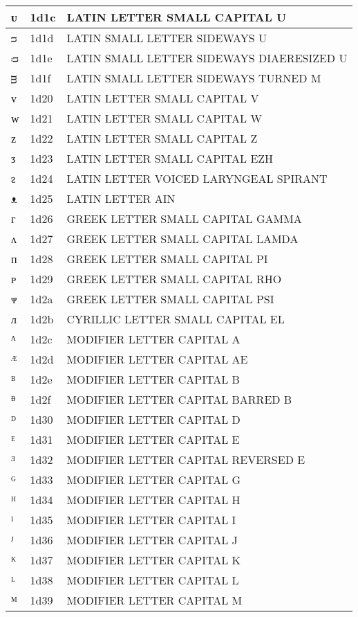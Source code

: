 \documentclass[12pt,letterpaper,openany]{book}
\begin{document}
\begin{center}
\begin{supertabular}{|m{0.25in}|m{0.5in}|m{4in}|}
ᴜ & 1d1c & LATIN LETTER SMALL CAPITAL U\\\hline
ᴝ & 1d1d & LATIN SMALL LETTER SIDEWAYS U\\\hline
ᴞ & 1d1e & LATIN SMALL LETTER SIDEWAYS DIAERESIZED U\\\hline
ᴟ & 1d1f & LATIN SMALL LETTER SIDEWAYS TURNED M\\\hline
ᴠ & 1d20 & LATIN LETTER SMALL CAPITAL V\\\hline
ᴡ & 1d21 & LATIN LETTER SMALL CAPITAL W\\\hline
ᴢ & 1d22 & LATIN LETTER SMALL CAPITAL Z\\\hline
ᴣ & 1d23 & LATIN LETTER SMALL CAPITAL EZH\\\hline
ᴤ & 1d24 & LATIN LETTER VOICED LARYNGEAL SPIRANT\\\hline
ᴥ & 1d25 & LATIN LETTER AIN\\\hline
ᴦ & 1d26 & GREEK LETTER SMALL CAPITAL GAMMA\\\hline
ᴧ & 1d27 & GREEK LETTER SMALL CAPITAL LAMDA\\\hline
ᴨ & 1d28 & GREEK LETTER SMALL CAPITAL PI\\\hline
ᴩ & 1d29 & GREEK LETTER SMALL CAPITAL RHO\\\hline
ᴪ & 1d2a & GREEK LETTER SMALL CAPITAL PSI\\\hline
ᴫ & 1d2b & CYRILLIC LETTER SMALL CAPITAL EL\\\hline
ᴬ & 1d2c & MODIFIER LETTER CAPITAL A\\\hline
ᴭ & 1d2d & MODIFIER LETTER CAPITAL AE\\\hline
ᴮ & 1d2e & MODIFIER LETTER CAPITAL B\\\hline
ᴯ & 1d2f & MODIFIER LETTER CAPITAL BARRED B\\\hline
ᴰ & 1d30 & MODIFIER LETTER CAPITAL D\\\hline
ᴱ & 1d31 & MODIFIER LETTER CAPITAL E\\\hline
ᴲ & 1d32 & MODIFIER LETTER CAPITAL REVERSED E\\\hline
ᴳ & 1d33 & MODIFIER LETTER CAPITAL G\\\hline
ᴴ & 1d34 & MODIFIER LETTER CAPITAL H\\\hline
ᴵ & 1d35 & MODIFIER LETTER CAPITAL I\\\hline
ᴶ & 1d36 & MODIFIER LETTER CAPITAL J\\\hline
ᴷ & 1d37 & MODIFIER LETTER CAPITAL K\\\hline
ᴸ & 1d38 & MODIFIER LETTER CAPITAL L\\\hline
ᴹ & 1d39 & MODIFIER LETTER CAPITAL M\\\hline

\end{supertabular}
\end{center}
\end{document}
